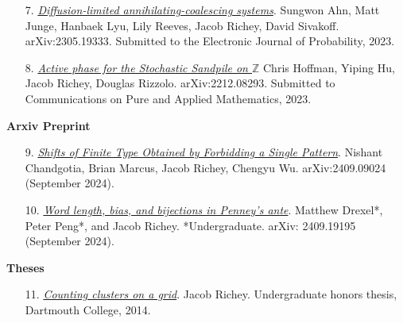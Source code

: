 \documentclass[letterpaper]{article}
\begin{document}
\begin{enumerate}
	\item[7.] \href{https://arxiv.org/abs/2305.19333}{\textit{Diffusion-limited annihilating-coalescing systems}}. Sungwon Ahn, Matt Junge, Hanbaek Lyu, Lily Reeves, Jacob Richey, David Sivakoff. arXiv:2305.19333. Submitted to the Electronic Journal of Probability, 2023.
	\item[8.] \href{https://arxiv.org/abs/2212.08293}{\textit{Active phase for the Stochastic Sandpile on $\mathbb{Z}$}} Chris Hoffman, Yiping Hu, Jacob Richey, Douglas Rizzolo. arXiv:2212.08293. Submitted to Communications on Pure and Applied Mathematics, 2023.
 \end{enumerate}
 
 \begin{center} {\textbf{Arxiv Preprint}} \end{center}
 
 \begin{enumerate}
	\item[9.] \href{https://arxiv.org/abs/2409.09024}{\textit{Shifts of Finite Type Obtained by Forbidding a Single Pattern}}. Nishant Chandgotia, Brian Marcus, Jacob Richey, Chengyu Wu. arXiv:2409.09024 (September 2024).  
	\item[10.] \href{http://arxiv.org/abs/2409.19195}{\textit{Word length, bias, and bijections in Penney's ante}}. Matthew Drexel*, Peter Peng*, and Jacob Richey. *Undergraduate. arXiv: 2409.19195 (September 2024).
 \end{enumerate}
 
 \begin{center} {\textbf{Theses}}\end{center}

\begin{enumerate}
\item[11.] \href{https://math.dartmouth.edu/theses/undergrad/2014/Richey-thesis.pdf}{\textit{Counting clusters on a grid}}. Jacob Richey. Undergraduate honors thesis, Dartmouth College, 2014.

\end{enumerate}
\end{document}

